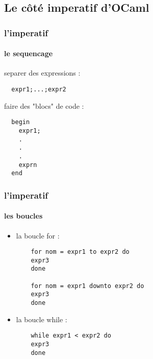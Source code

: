 \subsection{Le côté imperatif d'OCaml} %

\begin{frame}[fragile]
  \frametitle{l'imperatif}
  \framesubtitle{le sequencage}
  separer des expressions :
  \begin{lstlisting}
  expr1;...;expr2
  \end{lstlisting}
  faire des "blocs" de code :
  \begin{lstlisting}
  begin
    expr1; 
    .
    .
    .
    exprn
  end
  \end{lstlisting}
\end{frame}

\begin{frame}[fragile]
    \frametitle{l'imperatif}
    \framesubtitle{les boucles}
    \begin{itemize}
      \item
	la boucle for :
	\begin{lstlisting}
	for nom = expr1 to expr2 do 
	expr3
	done

	for nom = expr1 downto expr2 do
	expr3
	done
	\end{lstlisting}
      \item
	la boucle while :
	\begin{lstlisting}
	while expr1 < expr2 do
	expr3
	done
      \end{lstlisting}
  \end{itemize}
\end{frame}
